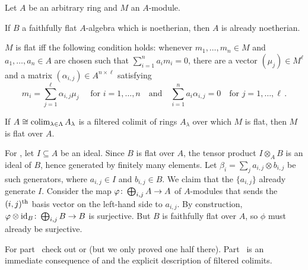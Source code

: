 \documentclass[a4paper, 10pt, oneside, DIV=9, chapterprefix=true, numbers=enddot, bibliography=totoc]{scrbook}
\begin{document}
\begin{lem}\label{lem:flat}
	Let $A$ be an arbitrary ring and $M$ an $A$-module.
	\begin{alphanumerate}
		\item If $B$ a faithfully flat $A$-algebra which is noetherian, then $A$ is already noetherian.
		\item $M$ is flat iff the following condition holds: whenever $m_1,\dotsc,m_n\in M$ and $a_1,\dots,a_n\in A$ are chosen such that $\sum_{i=1}^na_im_i=0$, there are a vector $(\mu_j)\in M^\ell$ and a matrix $(\alpha_{i,j})\in A^{n\times \ell}$ satisfying
		\begin{equation*}
			m_i=\sum_{j=1}^\ell \alpha_{i,j}\mu_j\quad\text{ for }i=1,\dotsc,n\quad\text{and}\quad\sum_{i=1}^na_i\alpha_{i,j}=0\quad\text{for }j=1,\dotsc,\ell\,.
		\end{equation*}
		\item If $A\cong \operatorname*{colim}_{\lambda\in\Lambda}A_\lambda$ is a filtered colimit of rings $A_\lambda$ over which $M$ is flat, then $M$ is flat over $A$.
	\end{alphanumerate}
\end{lem}
\begin{proof*}
	For , let $I\subseteq A$ be an ideal. Since $B$ is flat over $A$, the tensor product $I\otimes_AB$ is an ideal of $B$, hence generated by finitely many elements. Let $\beta_i=\sum_ja_{i,j}\otimes b_{i,j}$ be such generators, where $a_{i,j}\in I$ and $b_{i,j}\in B$. We claim that the $\{a_{i,j}\}$ already generate $I$. Consider the map $\phi\colon \bigoplus_{i,j}A\morphism A$ of $A$-modules that sends the $(i,j)^{\text{th}}$ basis vector on the left-hand side to $a_{i,j}$. By construction, $\phi\otimes\id_B\colon \bigoplus_{i,j}B\morphism B$ is surjective. But $B$ is faithfully flat over $A$, so $\phi$ must already be surjective.
	
	For part~ check out \cite[]{stacks-project} or \cite[Lemma~4.2.1]{jacobians} (but we only proved one half there). Part~ is an immediate consequence of  and the explicit description of filtered colimits.
\end{proof*}
\end{document}
